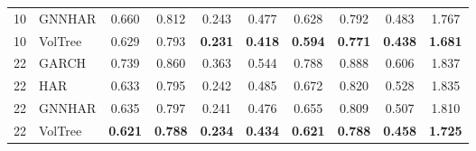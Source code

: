 \documentclass[runningheads]{llncs}
\begin{document}
\begin{table}[t]
\begin{tabular}{ll cccc cccc}
10 & GNNHAR   & 0.660 & 0.812 & 0.243 & 0.477 & 0.628 & 0.792 & 0.483 & 1.767 \\
10 & VolTree & 0.629 & 0.793 & \textbf{0.231} & \textbf{0.418} & \textbf{0.594} & \textbf{0.771} & \textbf{0.438} & \textbf{1.681} \\
\midrule
22 & GARCH    & 0.739 & 0.860 & 0.363 & 0.544 & 0.788 & 0.888 & 0.606 & 1.837 \\
22 & HAR      & 0.633 & 0.795 & 0.242 & 0.485 & 0.672 & 0.820 & 0.528 & 1.835 \\
22 & GNNHAR   & 0.635 & 0.797 & 0.241 & 0.476 & 0.655 & 0.809 & 0.507 & 1.810 \\
22 & VolTree & \textbf{0.621} & \textbf{0.788} & \textbf{0.234} & \textbf{0.434} & \textbf{0.621} & \textbf{0.788} & \textbf{0.458} & \textbf{1.725} \\
\bottomrule
\end{tabular}
\end{table}
\end{document}
